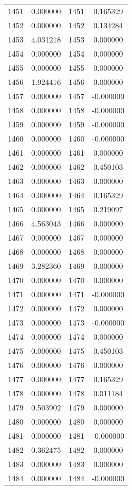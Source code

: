 \documentclass[12pt]{article}
\begin{document}
\begin{longtable}{@{}cccc@{}}
1451 & 0.000000 & 1451 & 0.165329 \\
1452 & 0.000000 & 1452 & 0.134284 \\
1453 & 4.031218 & 1453 & 0.000000 \\
1454 & 0.000000 & 1454 & 0.000000 \\
1455 & 0.000000 & 1455 & 0.000000 \\
1456 & 1.924416 & 1456 & 0.000000 \\
1457 & 0.000000 & 1457 & -0.000000 \\
1458 & 0.000000 & 1458 & -0.000000 \\
1459 & 0.000000 & 1459 & -0.000000 \\
1460 & 0.000000 & 1460 & -0.000000 \\
1461 & 0.000000 & 1461 & 0.000000 \\
1462 & 0.000000 & 1462 & 0.450103 \\
1463 & 0.000000 & 1463 & 0.000000 \\
1464 & 0.000000 & 1464 & 0.165329 \\
1465 & 0.000000 & 1465 & 0.219097 \\
1466 & 4.563043 & 1466 & 0.000000 \\
1467 & 0.000000 & 1467 & 0.000000 \\
1468 & 0.000000 & 1468 & 0.000000 \\
1469 & 3.282360 & 1469 & 0.000000 \\
1470 & 0.000000 & 1470 & 0.000000 \\
1471 & 0.000000 & 1471 & -0.000000 \\
1472 & 0.000000 & 1472 & 0.000000 \\
1473 & 0.000000 & 1473 & -0.000000 \\
1474 & 0.000000 & 1474 & 0.000000 \\
1475 & 0.000000 & 1475 & 0.450103 \\
1476 & 0.000000 & 1476 & 0.000000 \\
1477 & 0.000000 & 1477 & 0.165329 \\
1478 & 0.000000 & 1478 & 0.011184 \\
1479 & 0.503902 & 1479 & 0.000000 \\
1480 & 0.000000 & 1480 & 0.000000 \\
1481 & 0.000000 & 1481 & -0.000000 \\
1482 & 0.362475 & 1482 & 0.000000 \\
1483 & 0.000000 & 1483 & 0.000000 \\
1484 & 0.000000 & 1484 & -0.000000 \\

\end{longtable}
\end{document}
